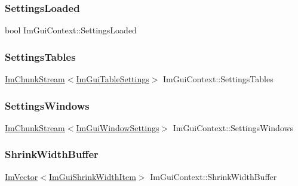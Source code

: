 \subsubsection{\texorpdfstring{Settings\+Loaded}{SettingsLoaded}}
{\footnotesize\ttfamily bool Im\+Gui\+Context\+::\+Settings\+Loaded}

\mbox{\label{structImGuiContext_ad2ede9b6bf347485792dbd3c9ec4f5eb}} 
\subsubsection{\texorpdfstring{Settings\+Tables}{SettingsTables}}
{\footnotesize\ttfamily \hyperlink{structImChunkStream}{Im\+Chunk\+Stream}$<$\hyperlink{structImGuiTableSettings}{Im\+Gui\+Table\+Settings}$>$ Im\+Gui\+Context\+::\+Settings\+Tables}

\mbox{\label{structImGuiContext_a17f0de5b1060388d02bec8ee2cb164ae}} 
\subsubsection{\texorpdfstring{Settings\+Windows}{SettingsWindows}}
{\footnotesize\ttfamily \hyperlink{structImChunkStream}{Im\+Chunk\+Stream}$<$\hyperlink{structImGuiWindowSettings}{Im\+Gui\+Window\+Settings}$>$ Im\+Gui\+Context\+::\+Settings\+Windows}

\mbox{\label{structImGuiContext_a835de1c6d4630fbe87831dcc1db80715}} 
\subsubsection{\texorpdfstring{Shrink\+Width\+Buffer}{ShrinkWidthBuffer}}
{\footnotesize\ttfamily \hyperlink{structImVector}{Im\+Vector}$<$\hyperlink{structImGuiShrinkWidthItem}{Im\+Gui\+Shrink\+Width\+Item}$>$ Im\+Gui\+Context\+::\+Shrink\+Width\+Buffer}

